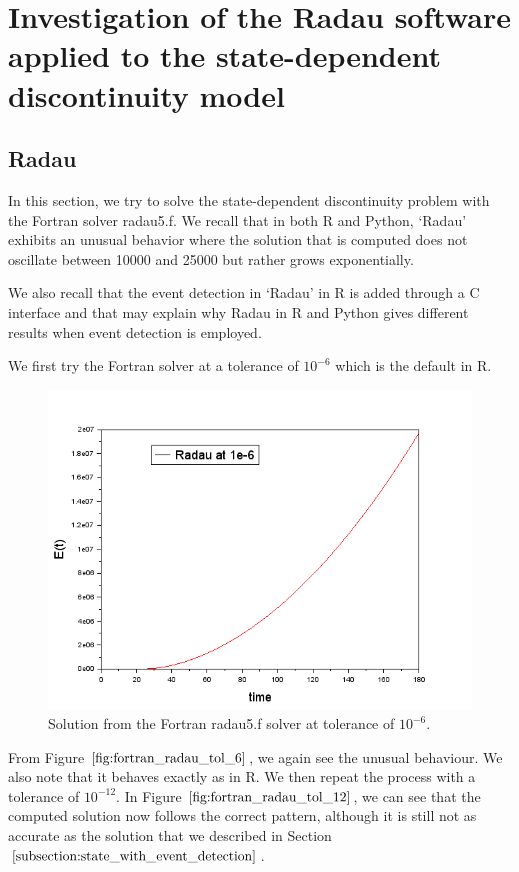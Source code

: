 
\section{Investigation of the Radau software applied to the state-dependent discontinuity model}
\label{section:fortran_inaccuracies}
\subsection{Radau}
In this section, we try to solve the state-dependent discontinuity problem with the Fortran solver radau5.f. We recall that in both R and Python, `Radau' exhibits an unusual behavior where the solution that is computed does not oscillate between 10000 and 25000 but rather grows exponentially. 

We also recall that the event detection in `Radau' in R is added through a C interface and that may explain why Radau in R and Python gives different results when event detection is employed.

We first try the Fortran solver at a tolerance of $10^{-6}$ which is the default in R.
\begin{figure}[h]
\centering
\includegraphics[width=0.7\linewidth]{./figures/fortran_radau_tol_6}
\caption{Solution from the Fortran radau5.f solver at tolerance of $10^{-6}$.}
\label{fig:fortran_radau_tol_6}
\end{figure}

From Figure $\ref{fig:fortran_radau_tol_6}$, we again see the unusual behaviour. We also note that it behaves exactly as in R. We then repeat the process with a tolerance of $10^{-12}$. In Figure $\ref{fig:fortran_radau_tol_12}$, we can see that the computed solution now follows the correct pattern, although it is still not as accurate as the solution that we described in Section $\ref{subsection:state_with_event_detection}$.

